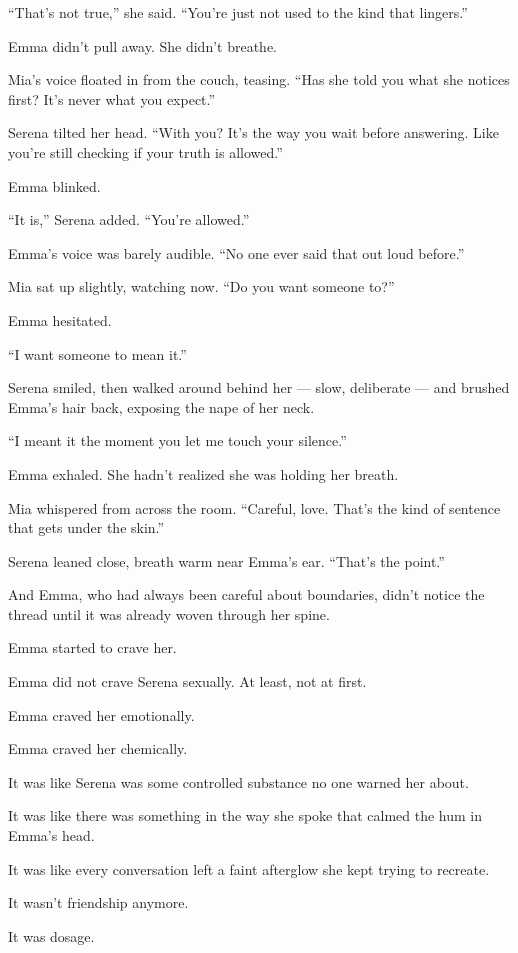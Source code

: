 “That’s not true,” she said. “You’re just not used to the kind that lingers.”

Emma didn’t pull away. She didn’t breathe.

Mia’s voice floated in from the couch, teasing. “Has she told you what she notices first? It’s 
never what you expect.”

Serena tilted her head. “With you? It’s the way you wait before answering. Like you’re still 
checking if your truth is allowed.”

Emma blinked.

“It is,” Serena added. “You’re allowed.”

Emma’s voice was barely audible. “No one ever said that out loud before.”

Mia sat up slightly, watching now. “Do you want someone to?”

Emma hesitated.

“I want someone to mean it.”

Serena smiled, then walked around behind her --- slow, deliberate --- and brushed Emma’s hair 
back, exposing the nape of her neck.

“I meant it the moment you let me touch your silence.”

Emma exhaled. She hadn’t realized she was holding her breath.

Mia whispered from across the room. “Careful, love. That’s the kind of sentence that gets under the skin.”

Serena leaned close, breath warm near Emma’s ear. “That’s the point.”

And Emma, who had always been careful about boundaries,
didn’t notice the thread
until it was already woven through her spine.

Emma started to crave her. 

Emma did not crave Serena sexually. At least, not at first. 

Emma craved her emotionally.

Emma craved her chemically.

It was like Serena was some controlled substance no one warned her about.

It was like there was something in the way she spoke that calmed the hum in Emma’s head.

It was like every conversation left a faint afterglow she kept trying to recreate.

It wasn’t friendship anymore.

It was dosage.

